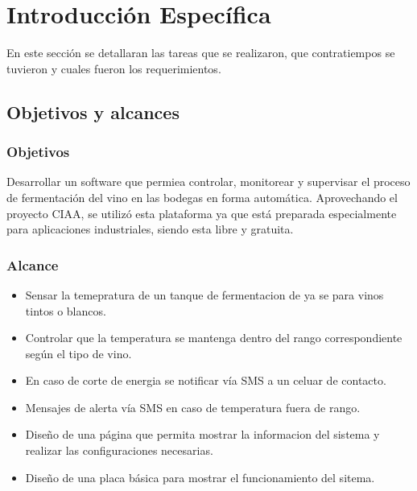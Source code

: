 \chapter{Introducción Específica} %

\label{Chapter2}
%
En este sección se detallaran las tareas que se realizaron, que contratiempos se tuvieron y cuales fueron los requerimientos.

\section{Objetivos y alcances}

\subsection*{Objetivos}
    Desarrollar un software que permiea controlar, monitorear y supervisar el proceso de fermentación del vino en las bodegas en forma automática. Aprovechando el proyecto CIAA, se utilizó esta plataforma ya que está preparada especialmente para aplicaciones industriales, siendo esta libre y gratuita.
\subsection*{Alcance}
  \begin{itemize}
      \item Sensar la temepratura de un tanque de fermentacion de ya se para vinos tintos o blancos.
      \item Controlar que la temperatura se mantenga dentro del rango correspondiente según el tipo de vino. 
      \item En caso de corte de energia se notificar vía SMS a un celuar de contacto.
      \item Mensajes de alerta vía SMS en caso de temperatura fuera de rango.
      \item Diseño de una página que permita mostrar la informacion del sistema y realizar las configuraciones necesarias.
      \item Diseño de una placa básica para mostrar el funcionamiento del sitema.
  \end{itemize}

